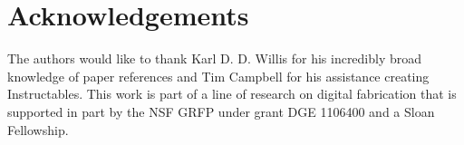 \section{Acknowledgements}
The authors would like to thank Karl D. D. Willis for his incredibly broad knowledge of paper references and Tim Campbell for his assistance creating Instructables.  This work is part of a line of research on digital fabrication that is supported in part by the NSF GRFP under grant DGE 1106400 and a Sloan Fellowship.
